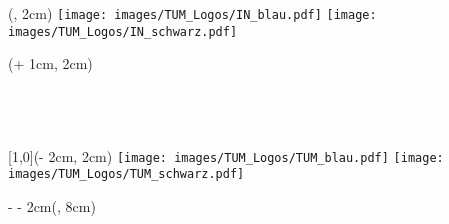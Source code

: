 \begin{titlepage}

\begin{textblock*}{\textwidth}(\coverborderleft, 2cm)%
		\ifx \monochromeCover \undefined
        	\texttt{[image: images/TUM\_Logos/IN\_blau.pdf]}%
        \else
        	\texttt{[image: images/TUM\_Logos/IN\_schwarz.pdf]}%
        \fi
\end{textblock*}%

\begin{textblock*}{\textwidth}(\coverborderleft + 1cm, 2cm)%
    	\setlength{\baselineskip}{11pt}%
    	\ifx \monochromeCover \undefined
        	\textcolor{UniversitaetFarbe} { %
        	\fontsize{9}{11}\selectfont%
        	\sffamily \chair\\%
        	\sffamily \faculty\\%
        	\sffamily \uni }
    \else
        	\textcolor{black} { %
        	\fontsize{9}{11}\selectfont%
        	\sffamily \chair\\%
        	\sffamily \faculty\\%
        	\sffamily \uni }
    \fi
\end{textblock*}%

\begin{textblock*}{\UniversitaetLogoBreite}[1,0](\paperwidth - 2cm, 2cm)%
		\ifx \monochromeCover \undefined
        	\texttt{[image: images/TUM\_Logos/TUM\_blau.pdf]}%
        \else
        	\texttt{[image: images/TUM\_Logos/TUM\_schwarz.pdf]}%
        \fi
\end{textblock*}%

\begin{textblock*}{\paperwidth - \coverborderleft - 2cm}(\coverborderleft , 8cm)%
\raggedright %
{\sffamily \Large \worktype}\\
{\sffamily \huge \titleFirstLanguage \par} %
\vspace{1cm}
\sffamily \Large \textbf{\authorname}\\
\end{textblock*}

~\\ %
\end{titlepage}